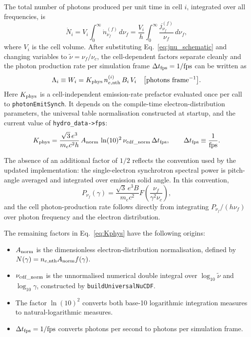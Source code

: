 \documentclass[12pt,a4paper]{article}
\newcommand{\nuth}{\tilde{\nu}}
\newcommand{\nuf}{\nu_{\!f}}
\newcommand{\nuc}{\nu_c}
\newcommand{\nenth}{n_{e,\mathrm{nth}}}
\newcommand{\code}[1]{\texttt{#1}}
\begin{document}
The total number of photons produced per unit time in cell \(i\),
integrated over all frequencies, is
\begin{equation}
	\dot{N}_i
	= V_i \int_0^\infty \dot{n}_{\nuf}^{(f)}\,d\nuf
	= \frac{V_i}{h}
	\int_0^\infty \frac{j_{\nuf}^{(f)}}{\nuf}\,d\nuf,
	\label{eq:Ndot_total}
\end{equation}
where \(V_i\) is the cell volume. After substituting
Eq.~\eqref{eq:jnu_schematic} and changing variables to
\(\nuth = \nuf/\nuc\), the cell-dependent factors separate cleanly and
the photon production rate per simulation frame
\(\Delta t_{\rm fps} = 1/\text{fps}\) can be written as
\begin{equation}
	\Lambda_i \equiv W_i
	= K_{\rm phys}\,\nenth^{(i)}\,B_i\,V_i
	\quad
	\bigl[\mathrm{photons\ frame^{-1}}\bigr].
\end{equation}
Here \(K_{\rm phys}\) is a cell-independent emission-rate prefactor
evaluated once per call to \code{photonEmitSynch}. It depends on the
compile-time electron-distribution parameters, the universal table
normalisation constructed at startup, and the current value of
\code{hydro\_data->fps}:
\begin{equation}
	K_{\rm phys}
	=
	\frac{\sqrt{3}\,e^3}{m_e c^2 h}\,
	A_{\rm norm}\,
	\ln(10)^2\,
	\nu_{\rm cdf\_norm}\,
	\Delta t_{\rm fps},
	\qquad
	\Delta t_{\rm fps}
	\equiv
	\frac{1}{\mathrm{fps}}.
	\label{eq:Kphys}
\end{equation}

The absence of an additional factor of \(1/2\) reflects the convention
used by the updated implementation: the single-electron synchrotron
spectral power is pitch-angle averaged and integrated over emission
solid angle. In this convention,
\begin{equation}
	P_{\nu_f}(\gamma)
	=
	\frac{\sqrt{3}\,e^3B}{m_ec^2}
	F\!\left(\frac{\nu_f}{\gamma^2\nu_c}\right),
	\label{eq:single_electron_power}
\end{equation}
and the cell photon-production rate follows directly from integrating
\(P_{\nu_f}/(h\nu_f)\) over photon frequency and the electron
distribution.

The remaining factors in Eq.~\eqref{eq:Kphys} have the following
origins:
\begin{itemize}
	\item \(A_{\rm norm}\) is the dimensionless electron-distribution
	normalisation, defined by
	\(N(\gamma)=n_{e,\mathrm{nth}}A_{\rm norm}f(\gamma)\).
	\item \(\nu_{\rm cdf\_norm}\) is the unnormalised numerical
	double integral over \(\log_{10}\tilde{\nu}\) and
	\(\log_{10}\gamma\), constructed by
	\code{buildUniversalNuCDF}.
	\item The factor \(\ln(10)^2\) converts both base-10 logarithmic
	integration measures to natural-logarithmic measures.
	\item \(\Delta t_{\rm fps}=1/\mathrm{fps}\) converts photons per
	second to photons per simulation frame.
\end{itemize}
\end{document}
